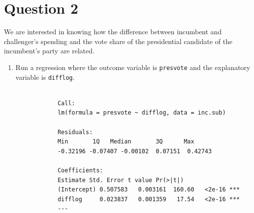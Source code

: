 \documentclass[12pt,letterpaper]{article}
\begin{document}
\section*{Question 2}
\noindent We are interested in knowing how the difference between incumbent and challenger's spending and the vote share of the presidential candidate of the incumbent's party are related.	\vspace{.25cm}
	\begin{enumerate}
		\item Run a regression where the outcome variable is \texttt{presvote} and the explanatory variable is \texttt{difflog}.
		
		\begin{lstlisting}
			
			Call:
			lm(formula = presvote ~ difflog, data = inc.sub)
			
			Residuals:
			Min       1Q   Median       3Q      Max 
			-0.32196 -0.07407 -0.00102  0.07151  0.42743 
			
			Coefficients:
			Estimate Std. Error t value Pr(>|t|)    
			(Intercept) 0.507583   0.003161  160.60   <2e-16 ***
			difflog     0.023837   0.001359   17.54   <2e-16 ***
			---
			

\end{lstlisting}
\end{enumerate}
\end{document}
